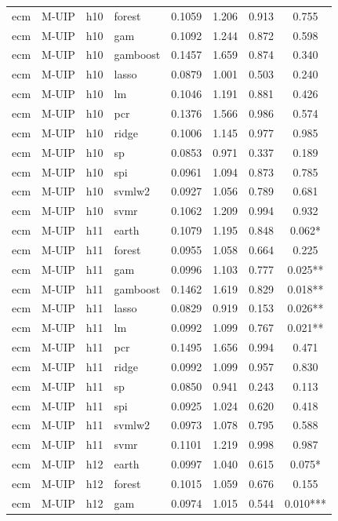 \begin{ThreePartTable}
\begin{longtable}[t]{llclcccc}
ecm & M-UIP & h10 & forest & 0.1059 & 1.206 & 0.913 & 0.755\\
ecm & M-UIP & h10 & gam & 0.1092 & 1.244 & 0.872 & 0.598\\
ecm & M-UIP & h10 & gamboost & 0.1457 & 1.659 & 0.874 & 0.340\\
ecm & M-UIP & h10 & lasso & 0.0879 & 1.001 & 0.503 & 0.240\\
ecm & M-UIP & h10 & lm & 0.1046 & 1.191 & 0.881 & 0.426\\
ecm & M-UIP & h10 & pcr & 0.1376 & 1.566 & 0.986 & 0.574\\
ecm & M-UIP & h10 & ridge & 0.1006 & 1.145 & 0.977 & 0.985\\
ecm & M-UIP & h10 & sp & 0.0853 & 0.971 & 0.337 & 0.189\\
ecm & M-UIP & h10 & spi & 0.0961 & 1.094 & 0.873 & 0.785\\
ecm & M-UIP & h10 & svmlw2 & 0.0927 & 1.056 & 0.789 & 0.681\\
ecm & M-UIP & h10 & svmr & 0.1062 & 1.209 & 0.994 & 0.932\\
\addlinespace
ecm & M-UIP & h11 & earth & 0.1079 & 1.195 & 0.848 & 0.062*\\
ecm & M-UIP & h11 & forest & 0.0955 & 1.058 & 0.664 & 0.225\\
ecm & M-UIP & h11 & gam & 0.0996 & 1.103 & 0.777 & 0.025**\\
ecm & M-UIP & h11 & gamboost & 0.1462 & 1.619 & 0.829 & 0.018**\\
ecm & M-UIP & h11 & lasso & 0.0829 & 0.919 & 0.153 & 0.026**\\
ecm & M-UIP & h11 & lm & 0.0992 & 1.099 & 0.767 & 0.021**\\
ecm & M-UIP & h11 & pcr & 0.1495 & 1.656 & 0.994 & 0.471\\
ecm & M-UIP & h11 & ridge & 0.0992 & 1.099 & 0.957 & 0.830\\
ecm & M-UIP & h11 & sp & 0.0850 & 0.941 & 0.243 & 0.113\\
ecm & M-UIP & h11 & spi & 0.0925 & 1.024 & 0.620 & 0.418\\
ecm & M-UIP & h11 & svmlw2 & 0.0973 & 1.078 & 0.795 & 0.588\\
ecm & M-UIP & h11 & svmr & 0.1101 & 1.219 & 0.998 & 0.987\\
\addlinespace
ecm & M-UIP & h12 & earth & 0.0997 & 1.040 & 0.615 & 0.075*\\
ecm & M-UIP & h12 & forest & 0.1015 & 1.059 & 0.676 & 0.155\\
ecm & M-UIP & h12 & gam & 0.0974 & 1.015 & 0.544 & 0.010***\\

\end{longtable}
\end{ThreePartTable}
